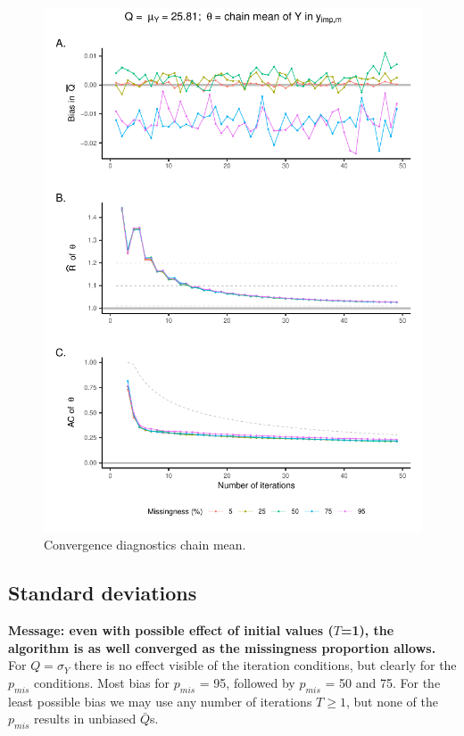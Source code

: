\documentclass[Royal,times,sageh]{sagej}
\begin{document}
\begin{figure}

{\centering \includegraphics{manuscript_files/figure-latex/mean-1} 

}

\caption{Convergence diagnostics chain mean.}\label{fig:mean}
\end{figure}

\hypertarget{standard-deviations}{%
\subsection{Standard deviations}\label{standard-deviations}}

\textbf{Message: even with possible effect of initial values (\(T\)=1),
the algorithm is as well converged as the missingness proportion
allows.} For \(Q=\sigma_Y\) there is no effect visible of the iteration
conditions, but clearly for the \(p_{mis}\) conditions. Most bias for
\(p_{mis}\) = 95, followed by \(p_{mis}\) = 50 and 75. For the least
possible bias we may use any number of iterations \(T\geq1\), but none
of the \(p_{mis}\) results in unbiased \(\bar{Q}\)s.
\end{document}
